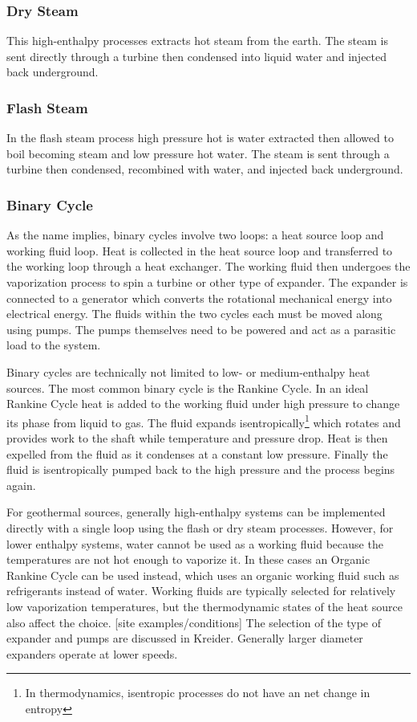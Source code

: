 \subsubsection{Dry Steam}
This high-enthalpy processes extracts hot steam from the earth. The steam is sent directly through a turbine then condensed into liquid water and injected back underground. 

\subsubsection{Flash Steam} 
In the flash steam process high pressure hot is water extracted then allowed to boil becoming steam and low pressure hot water. The steam is sent through a turbine then condensed, recombined with water, and injected back underground.

\subsubsection{Binary Cycle} 
As the name implies, binary cycles involve two loops: a heat source loop and working fluid loop. Heat is collected in the heat source loop and transferred to the working loop through a heat exchanger. The working fluid then undergoes the vaporization process to spin a turbine or other type of expander. The expander is connected to a generator which converts the rotational mechanical energy into electrical energy. The fluids within the two cycles each must be moved along using pumps. The pumps themselves need to be powered and act as a parasitic load to the system.

Binary cycles are technically not limited to low- or medium-enthalpy heat sources. The most common binary cycle is the Rankine Cycle. In an ideal Rankine Cycle heat is added to the working fluid under high pressure to change its phase from liquid to gas. The fluid expands isentropically\footnote{In thermodynamics, isentropic processes do not have an net change in entropy} which rotates and provides work to the shaft while temperature and pressure drop. Heat is then expelled from the fluid as it condenses at a constant low pressure. Finally the fluid is isentropically pumped back to the high pressure and the process begins again.

For geothermal sources, generally high-enthalpy systems can be implemented directly with a single loop using the flash or dry steam processes. However, for lower enthalpy systems, water cannot be used as a working fluid because the temperatures are not hot enough to vaporize it. In these cases an Organic Rankine Cycle can be used instead, which uses an organic working fluid such as refrigerants instead of water. Working fluids are typically selected for relatively low vaporization temperatures, but the thermodynamic states of the heat source also affect the choice. [site examples/conditions] The selection of the type of expander and pumps are discussed in Kreider. \cite{Kreider} Generally larger diameter expanders operate at lower speeds.



